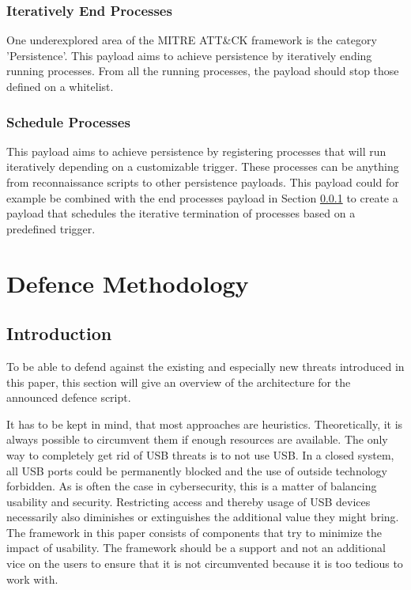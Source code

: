 \subsubsection{Iteratively End Processes} \label{Iteratively End Processes}

One underexplored area of the MITRE ATT\&CK framework is the category 'Persistence'. This payload aims to achieve persistence by iteratively ending running processes. From all the running processes, the payload should stop those defined on a whitelist.


\subsubsection{Schedule Processes}

This payload aims to achieve persistence by registering processes that will run iteratively depending on a customizable trigger. These processes can be anything from reconnaissance scripts to other persistence payloads. This payload could for example be combined with the end processes payload in Section \ref{Iteratively End Processes} to create a payload that schedules the iterative termination of processes based on a predefined trigger.



\section{Defence Methodology} \label{Defence Methodology}

\subsection{Introduction}

To be able to defend against the existing and especially new threats introduced in this paper, this section will give an overview of the architecture for the announced defence script.

It has to be kept in mind, that most approaches are heuristics. Theoretically, it is always possible to circumvent them if enough resources are available. The only way to completely get rid of USB threats is to not use USB. In a closed system, all USB ports could be permanently blocked and the use of outside technology forbidden. As is often the case in cybersecurity, this is a matter of balancing usability and security. Restricting access and thereby usage of USB devices necessarily also diminishes or extinguishes the additional value they might bring. The framework in this paper consists of components that try to minimize the impact of usability. The framework should be a support and not an additional vice on the users to ensure that it is not circumvented because it is too tedious to work with.  

